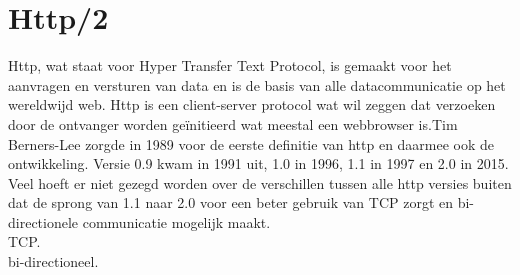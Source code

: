 \section{Http/2}
Http, wat staat voor Hyper Transfer Text Protocol, is gemaakt voor het aanvragen en versturen van data en is de basis van alle datacommunicatie op het wereldwijd web. Http is een client-server protocol wat wil zeggen dat verzoeken door de ontvanger worden geïnitieerd wat meestal een webbrowser is.Tim Berners-Lee zorgde in 1989 voor de eerste definitie van http en daarmee ook de ontwikkeling. Versie 0.9 kwam in 1991 uit, 1.0 in 1996, 1.1 in 1997 en 2.0 in 2015. Veel hoeft er niet gezegd worden over de verschillen tussen alle http versies buiten dat de sprong van 1.1 naar 2.0 voor een beter gebruik van TCP zorgt en bi-directionele communicatie mogelijk maakt.\\
TCP.\\
bi-directioneel.
